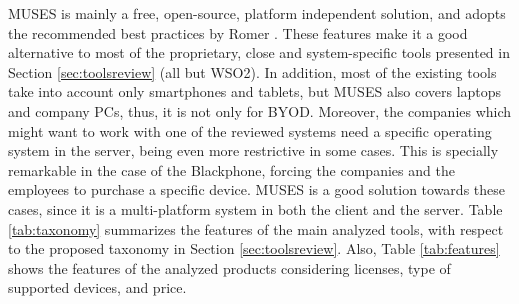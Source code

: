 MUSES is mainly a free, open-source, platform independent solution, and adopts the recommended best practices by Romer \cite{Romer14BestPractices}. %
These features make it a good alternative to most of the proprietary, close and system-specific tools presented in Section \ref{sec:toolsreview} (all but WSO2). In addition, most of the existing tools take into account only smartphones and tablets, but MUSES also covers laptops and company PCs, thus, it is not only for BYOD. Moreover, the companies which might want to work with one of the reviewed systems need a specific operating system in the server, being even more restrictive in some cases. This is specially remarkable in the case of the Blackphone, forcing the companies and the employees to purchase a specific device. MUSES is a good solution towards these cases, since it is a multi-platform system in both the client and the server. 
Table \ref{tab:taxonomy} summarizes the features of the main analyzed tools, with respect to the proposed taxonomy in Section \ref{sec:toolsreview}. Also, Table \ref{tab:features} shows the features of the analyzed products considering licenses, type of supported devices, and price.

